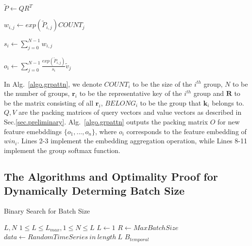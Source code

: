 \begin{sloppypar}
\begin{algorithm}
\begin{algorithmic}[1]
                \State $\widetilde{P} \gets QR^T$
                
                    \State $w_{i,j} \gets exp(\widetilde{P}_{i,j})COUNT_j$
                    \EndFor
                \EndFor
                
                    \State $s_i \gets \sum_{j=0}^{N-1} w_{i,j}$ 
                \EndFor
                
                    \State $o_{i} \gets \sum_{j=0}^{N-1}\frac{exp(\widetilde{P}_{i,j})}{s_i}\widetilde{v}_j$
                \EndFor
                    
                \State {}
            \EndFunction
            
        \end{algorithmic}
\end{algorithm}

In Alg.~\ref{algo.grpattn}, we denote $COUNT_i$ to be the size of the $i^{th}$ group, $N$ to be the number of groups, $\mathbf{r}_i$ to be the representative key of the $i^{th}$ group and $\mathbf{R}$ to be the matrix consisting of all $\mathbf{r}_i$, $BELONG_i$ to be the group that $\mathbf{k}_i$ belongs to. $Q,V$ are the packing matrices of query vectors and value vectors as described in Sec.\ref{sec.preliminary}. Alg.~\ref{algo.grpattn} outputs the packing matrix $O$ for new feature emebddings $\{o_1,...,o_n\}$, where $o_i$ corresponds to the feature embedding of $win_i$. 
Lines 2-3 implement the embedding aggregation operation, while Lines 8-11 implement the group softmax function.

\subsection{The Algorithms and Optimality Proof for Dynamically Determing Batch Size}
\label{appendix.batch}

\begin{algorithm}[h]
    \caption{Binary Search for Batch Size}
    \label{algo.binsearch}
    \begin{algorithmic}[1] 
    \Require $L,N$
    \Ensure $1 \leq L \leq L_{max}, 1\leq N \leq L$
                \State $L \gets 1$
                \State $R \gets MaxBatchSize$
                \State $data \gets RandomTimeSeries\ in\ length\  L$
                \State $B_{temporal}$
                     

\end{algorithmic}
\end{algorithm}
\end{sloppypar}
